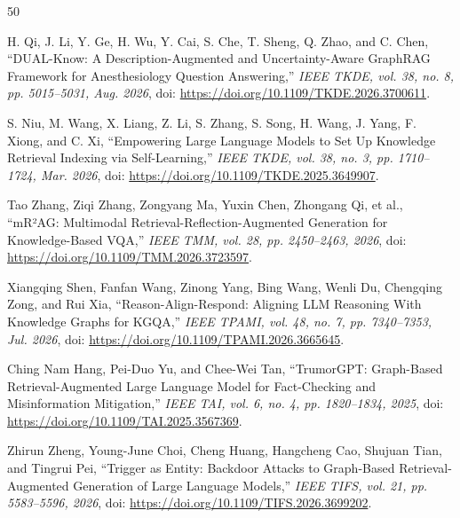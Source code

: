 \documentclass[conference,a4paper]{IEEEtran}
\begin{document}
\begingroup
\scriptsize
\setlength{\parskip}{0pt}
\def\IEEEbibitemsep{0.35pt plus 0.15pt minus 0.10pt}
\begin{thebibliography}{50}

 H. Qi, J. Li, Y. Ge, H. Wu, Y. Cai, S. Che, T. Sheng, Q. Zhao, and C. Chen, ``DUAL-Know: A Description-Augmented and Uncertainty-Aware GraphRAG Framework for Anesthesiology Question Answering,'' \emph{IEEE TKDE, vol. 38, no. 8, pp. 5015--5031, Aug. 2026}, doi: \url{https://doi.org/10.1109/TKDE.2026.3700611}.

 S. Niu, M. Wang, X. Liang, Z. Li, S. Zhang, S. Song, H. Wang, J. Yang, F. Xiong, and C. Xi, ``Empowering Large Language Models to Set Up Knowledge Retrieval Indexing via Self-Learning,'' \emph{IEEE TKDE, vol. 38, no. 3, pp. 1710--1724, Mar. 2026}, doi: \url{https://doi.org/10.1109/TKDE.2025.3649907}.

 Tao Zhang, Ziqi Zhang, Zongyang Ma, Yuxin Chen, Zhongang Qi, et al., ``mR²AG: Multimodal Retrieval-Reflection-Augmented Generation for Knowledge-Based VQA,'' \emph{IEEE TMM, vol. 28, pp. 2450--2463, 2026}, doi: \url{https://doi.org/10.1109/TMM.2026.3723597}.

 Xiangqing Shen, Fanfan Wang, Zinong Yang, Bing Wang, Wenli Du, Chengqing Zong, and Rui Xia, ``Reason-Align-Respond: Aligning LLM Reasoning With Knowledge Graphs for KGQA,'' \emph{IEEE TPAMI, vol. 48, no. 7, pp. 7340--7353, Jul. 2026}, doi: \url{https://doi.org/10.1109/TPAMI.2026.3665645}.

 Ching Nam Hang, Pei-Duo Yu, and Chee-Wei Tan, ``TrumorGPT: Graph-Based Retrieval-Augmented Large Language Model for Fact-Checking and Misinformation Mitigation,'' \emph{IEEE TAI, vol. 6, no. 4, pp. 1820--1834, 2025}, doi: \url{https://doi.org/10.1109/TAI.2025.3567369}.

 Zhirun Zheng, Young-June Choi, Cheng Huang, Hangcheng Cao, Shujuan Tian, and Tingrui Pei, ``Trigger as Entity: Backdoor Attacks to Graph-Based Retrieval-Augmented Generation of Large Language Models,'' \emph{IEEE TIFS, vol. 21, pp. 5583--5596, 2026}, doi: \url{https://doi.org/10.1109/TIFS.2026.3699202}.


\end{thebibliography}
\end{document}
